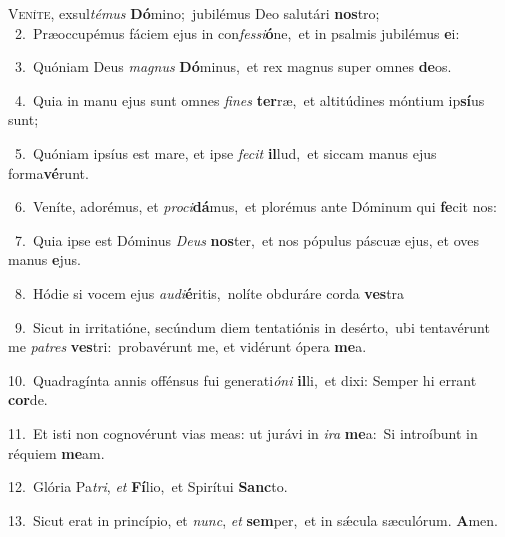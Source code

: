 \lettrine{\initial\textcolor{\initialcolor}{V}}{eníte,} exsul\-\textit{té}\-\textit{mus} \textbf{Dó}\-mino;~\star jubilémus Deo salutári \textbf{nos}\-tro;\\
{\numbfont\textcolor{\numbcolor}{~2.}}~Præoccupémus fáciem ejus in con\-\textit{fes}\-\textit{si}\textbf{ó}ne,~\star et in psalmis jubilémus \textbf{e}\-i:\par
{\numbfont\textcolor{\numbcolor}{~3.}}~Quóniam Deus \textit{ma}\-\textit{gnus} \textbf{Dó}\-minus,~\star et rex magnus super omnes \textbf{de}\-os.\par
{\numbfont\textcolor{\numbcolor}{~4.}}~Quia in manu ejus sunt omnes \textit{fi}\-\textit{nes} \textbf{ter}\-ræ,~\star et altitúdines móntium ip\-\textbf{sí}\-us sunt;\par
{\numbfont\textcolor{\numbcolor}{~5.}}~Quóniam ipsíus est mare, et ipse \textit{fe}\-\textit{cit} \textbf{il}\-lud,~\star et siccam manus ejus forma\-\textbf{vé}\-runt.\par
{\numbfont\textcolor{\numbcolor}{~6.}}~Veníte, adorémus, et \textit{pro}\-\textit{ci}\textbf{dá}mus,~\star et plorémus ante Dóminum qui \textbf{fe}\-cit nos:\par
{\numbfont\textcolor{\numbcolor}{~7.}}~Quia ipse est Dóminus \textit{De}\-\textit{us} \textbf{nos}\-ter,~\star et nos pópulus páscuæ ejus, et oves manus \textbf{e}\-jus.\par
{\numbfont\textcolor{\numbcolor}{~8.}}~Hódie si vocem ejus \textit{au}\-\textit{di}\textbf{é}ritis,~\star nolíte obduráre corda \textbf{ves}\-tra\par
{\numbfont\textcolor{\numbcolor}{~9.}}~Sicut in irritatióne, secúndum diem tentatiónis in desérto,~\dagger ubi tentavérunt me \textit{pa}\-\textit{tres} \textbf{ves}\-tri:~\star probavérunt me, et vidérunt ópera \textbf{me}\-a.\par
{\numbfont\textcolor{\numbcolor}{10.}}~Quadragínta annis offénsus fui generati\-\textit{ó}\-\textit{ni} \textbf{il}\-li,~\star et dixi: Semper hi errant \textbf{cor}\-de.\par
{\numbfont\textcolor{\numbcolor}{11.}}~Et isti non cognovérunt vias meas: ut jurávi in \textit{i}\-\textit{ra} \textbf{me}\-a:~\star Si introíbunt in réquiem \textbf{me}\-am.\par
{\numbfont\textcolor{\numbcolor}{12.}}~Glória Pa\-\textit{tri}\-, \textit{et} \textbf{Fí}\-lio,~\star et Spirítui \textbf{Sanc}\-to.\par
{\numbfont\textcolor{\numbcolor}{13.}}~Sicut erat in princípio, et \textit{nunc}\-, \textit{et} \textbf{sem}\-per,~\star et in sǽcula sæculórum. \textbf{A}\-men.\par

